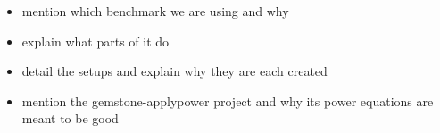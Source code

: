\begin{itemize}
    \item mention which benchmark we are using and why
    \item explain what parts of it do
    \item detail the setups and explain why they are each created
    \item mention the gemstone-applypower project and why its power equations
          are meant to be good
\end{itemize}